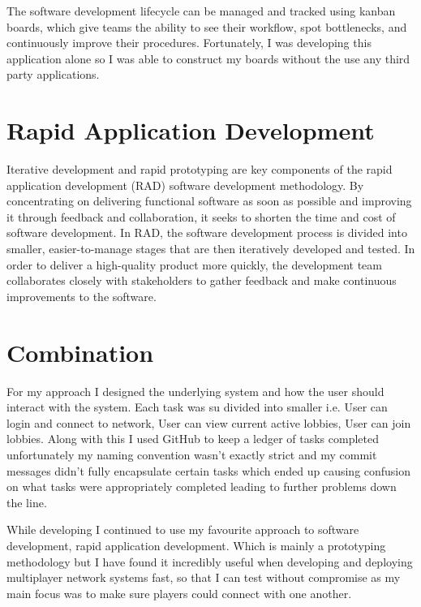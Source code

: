 The software development lifecycle can be managed and tracked using kanban boards, which give teams the ability to see their workflow, spot bottlenecks, and continuously improve their procedures.\cite{pressman2015software} Fortunately, I was developing this application alone so I was able to construct my boards without the use any third party applications.

\section{Rapid Application Development}

Iterative development and rapid prototyping are key components of the rapid application development (RAD) software development methodology. By concentrating on delivering functional software as soon as possible and improving it through feedback and collaboration, it seeks to shorten the time and cost of software development.\cite{al2017project}
In RAD, the software development process is divided into smaller, easier-to-manage stages that are then iteratively developed and tested. In order to deliver a high-quality product more quickly, the development team collaborates closely with stakeholders to gather feedback and make continuous improvements to the software.\cite{pressman2015software}

\section{Combination}

For my approach I designed the underlying system and how the user should interact with the system. Each task was su divided into smaller i.e. User can login and connect to network, User can view current active lobbies, User can join lobbies. Along with this I used GitHub to keep a ledger of tasks completed unfortunately my naming convention wasn't exactly strict and my commit messages didn't fully encapsulate certain tasks which ended up causing confusion on what tasks were appropriately completed leading to further problems down the line.

While developing I continued to use my favourite approach to software development, rapid application development. Which is mainly a prototyping methodology but I have found it incredibly useful when developing and deploying multiplayer network systems fast, so that I can test without compromise as my main focus was to make sure players could connect with one another.

